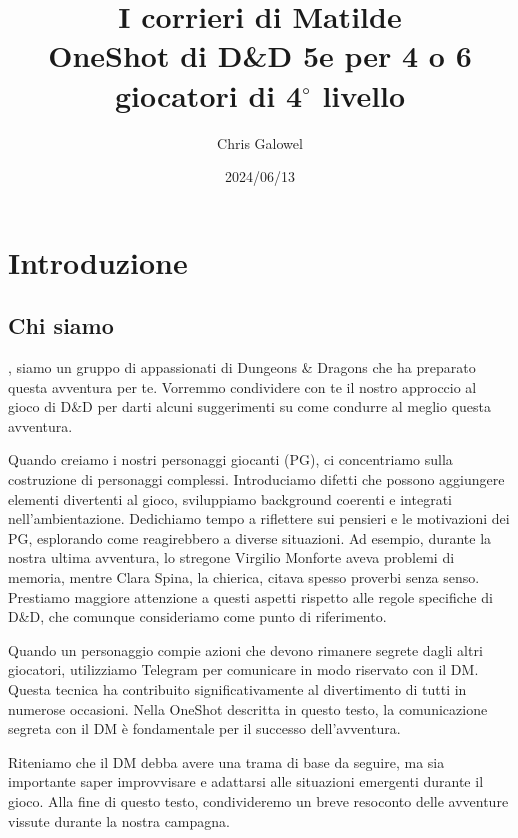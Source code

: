 \documentclass[letterpaper,twocolumn,openany,nodeprecatedcode]{dndbook}
\title{I corrieri di Matilde \\
\large OneShot di D\&D 5e per 4 o 6 giocatori di 4$^\circ$ livello}
\author{Chris Galowel}
\date{2024/06/13}
\begin{document}
\frontmatter

\maketitle

\tableofcontents


\mainmatter%





\chapter{Introduzione}

\section{Chi siamo}
, siamo un gruppo di appassionati di Dungeons \& Dragons che ha preparato questa avventura per te. Vorremmo condividere con te il nostro approccio al gioco di D\&D per darti alcuni suggerimenti su come condurre al meglio questa avventura.

Quando creiamo i nostri personaggi giocanti (PG), ci concentriamo sulla costruzione di personaggi complessi. Introduciamo difetti che possono aggiungere elementi divertenti al gioco, sviluppiamo background coerenti e integrati nell'ambientazione. Dedichiamo tempo a riflettere sui pensieri e le motivazioni dei PG, esplorando come reagirebbero a diverse situazioni. Ad esempio, durante la nostra ultima avventura, lo stregone Virgilio Monforte aveva problemi di memoria, mentre Clara Spina, la chierica, citava spesso proverbi senza senso. Prestiamo maggiore attenzione a questi aspetti rispetto alle regole specifiche di D\&D, che comunque consideriamo come punto di riferimento.

Quando un personaggio compie azioni che devono rimanere segrete dagli altri giocatori, utilizziamo Telegram per comunicare in modo riservato con il DM. Questa tecnica ha contribuito significativamente al divertimento di tutti in numerose occasioni. Nella OneShot descritta in questo testo, la comunicazione segreta con il DM è fondamentale per il successo dell'avventura.

Riteniamo che il DM debba avere una trama di base da seguire, ma sia importante saper improvvisare e adattarsi alle situazioni emergenti durante il gioco. Alla fine di questo testo, condivideremo un breve resoconto delle avventure vissute durante la nostra campagna.
\end{document}
